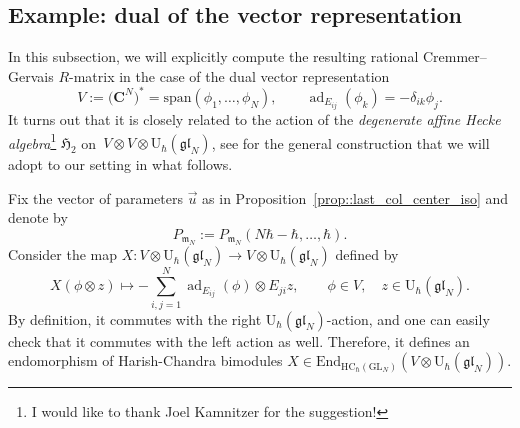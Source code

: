 \documentclass[10pt,a4paper]{article}
\numberwithin{equation}{section}
\newcommand{\C}{\mathbf{C}}
\newcommand{\U}{\mathrm{U}_{\hbar}}
\newcommand{\GL}{\mathrm{GL}}
\newcommand{\m}{\mathfrak{m}}
\DeclareMathOperator{\ad}{ad}
\newcommand{\End}{\mathrm{End}}
\newcommand{\HC}{\mathrm{HC}_{\hbar}}
\newcommand{\gl}{\mathfrak{gl}}
\begin{document}
	\subsection{Example: dual of the vector representation}
	\label{subsect:vector_rep_constant}
	
	In this subsection, we will explicitly compute the resulting rational Cremmer--Gervais $R$-matrix in the case of the dual vector representation
	\[
	V := \bigl(\C^N\bigr)^* = \mathrm{span}(\phi_1,\dots,\phi_N), \qquad \ad_{E_{ij}}(\phi_k) = -\delta_{ik} \phi_j.
	\]
	It turns out that it is closely related to the action of the \emph{degenerate affine Hecke algebra}\footnote{I would like to thank Joel Kamnitzer for the suggestion!} $\mathfrak{H}_2$ on~${V \otimes V \otimes \U(\gl_N)}$, see \cite[Example 2.1]{Cherednik} for the general construction that we will adopt to our setting in what follows.
	
	Fix the vector of parameters $\vec{u}$ as in Proposition~\ref{prop::last_col_center_iso} and denote by
	\[
	P_{\m_N} := P_{\m_N} (N\hbar-\hbar,\dots,\hbar).
	\]
	Consider the map $X\colon V \otimes \U(\gl_N) \rightarrow V \otimes \U(\gl_N)$ defined by
	\[
	X(\phi\otimes z) \mapsto -\sum_{i,j=1}^N \ad_{E_{ij}}(\phi) \otimes E_{ji} z,\qquad \phi \in V, \quad z\in \U(\gl_N).
	\]
	By definition, it commutes with the right $\U(\gl_N)$-action, and one can easily check that it commutes with the left action as well. Therefore, it defines an endomorphism of Harish-Chandra bimodules $X \in \End_{\HC(\GL_N)} (V \otimes \U(\gl_N))$.
	
\end{document}
